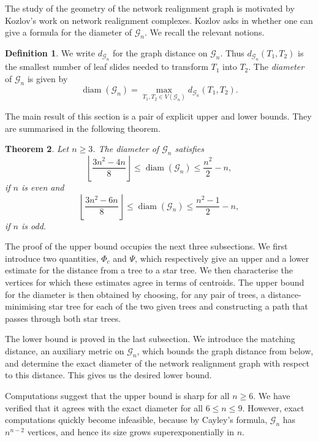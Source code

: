 \documentclass[reqno,dvipsnames]{amsart}
\newtheorem{theorem}{Theorem}[section]
\theoremstyle{plain}
\numberwithin{equation}{section}
\theoremstyle{definition}
\newtheorem{definition}[theorem]{Definition}
\begin{document}
The study of the geometry of the network realignment graph is motivated by Kozlov's work on network realignment complexes. Kozlov asks in \cite{Kozlov25} whether one can give a formula for the diameter of $\mathcal{G}_n$. We recall the relevant notions.

\begin{definition}
	We write $d_{\mathcal{G}_n}$ for the graph distance on $\mathcal{G}_n$. Thus $d_{\mathcal{G}_n}(T_1,T_2)$ is the smallest number of leaf slides needed to transform $T_1$ into $T_2$. The \textit{diameter} of $\mathcal{G}_n$ is given by
	\[
	\operatorname{diam}(\mathcal{G}_n) = \max_{T_1,T_2\in V(\mathcal{G}_n)} d_{\mathcal{G}_n}(T_1,T_2).
	\]
\end{definition}

The main result of this section is a pair of explicit upper and lower bounds. They are summarised in the following theorem.

\begin{theorem}
	Let $n\geq 3$. The diameter of $\mathcal{G}_n$ satisfies 
	\[
	\left\lfloor \frac{3n^2-4n}{8} \right\rfloor \leq \operatorname{diam}(\mathcal{G}_n)\leq \frac{n^2}{2}-n,
	\]
	if $n$ is even and 
	\[
	\left\lfloor \frac{3n^2-6n}{8} \right\rfloor \leq \operatorname{diam}(\mathcal{G}_n)\leq \frac{n^2-1}{2}-n,
	\]
	if $n$ is odd.
\end{theorem}

The proof of the upper bound occupies the next three subsections. We first introduce two quantities, $\Phi_c$ and $\Psi$, which respectively give an upper and a lower estimate for the distance from a tree to a star tree. We then characterise the vertices for which these estimates agree in terms of centroids. The upper bound for the diameter is then obtained by choosing, for any pair of trees, a distance-minimising star tree for each of the two given trees and constructing a path that passes through both star trees.

The lower bound is proved in the last subsection. We introduce the matching distance, an auxiliary metric on $\mathcal{G}_n$, which bounds the graph distance from below, and determine the exact diameter of the network realignment graph with respect to this distance. This gives us the desired lower bound.

Computations suggest that the upper bound is sharp for all $n\geq 6$. We have verified that it agrees with the exact diameter for all $6\leq n\leq 9$. However, exact computations quickly become infeasible, because by Cayley's formula, $\mathcal{G}_n$ has $n^{n-2}$ vertices, and hence its size grows superexponentially in $n$.
\end{document}

